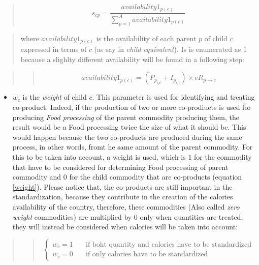 \documentclass[]{article}
\providecommand{\tightlist}{%
  \setlength{\itemsep}{0pt}\setlength{\parskip}{0pt}}
\begin{document}
\begin{quote}
\begin{equation}
\label{eq:shares}
s_{cp} = \frac{availability1_{p(c)}}{\sum \limits_{p=1}^A{availability1_{p(c)}}}
\end{equation}
\end{quote}

\begin{quote}
where \(availability1_{p(c)}\) is the availability of each parent \(p\)
of child \(c\) expressed in terms of \(c\) (as say in \emph{child
equivalent}). Is is enumerated as \(1\) because a slighlty different
availability will be found in a following step:
\end{quote}

\begin{quote}
\begin{quote}
\begin{equation}
\label{eq:availability 1}
availability1_{p(c)} = (P_{p_{ijt}} + I_{p_{ijt}})\times eR_{p\to c}
\end{equation}
\end{quote}
\end{quote}

\begin{itemize}
\tightlist
\item
  \(w_{c}\) is the \emph{weight} of child \(c\). This parameter is used
  for identifying and treating co-product. Indeed, if the production of
  two or more co-prodiucts is used for producing \emph{Food processing}
  of the parent commodity producing them, the result would be a Food
  processing twice the size of what it should be. This would happen
  because the two co-products are produced during the same process, in
  other words, fromt he same amount of the parent commodity. For this to
  be taken into account, a weight is used, which is 1 for the commodity
  that have to be considered for determining Food processing of parent
  commodity and 0 for the child commodity that are co-products (equation
  \ref{weight}). Please notice that, the co-products are still important
  in the standardization, because they contribute in the creation of the
  calories availability of the country, therefore, these commodities
  (Also called \emph{zero weight} commodities) are multiplied by 0 only
  when quantities are treated, they will instead be considered when
  calories will be taken into account:
\end{itemize}

\begin{quote}
\begin{quote}
\begin{equation}
\label{eq:weight}
\begin{cases}
w_{c} = 1      & \quad \text{if boht quantity and calories have to be standardized} \\
w_{c} = 0      & \quad \text{if only calories have to be standardized}
\end{cases}
\end{equation}
\end{quote}
\end{quote}
\end{document}
